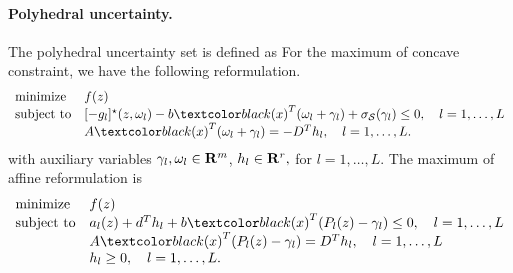 \paragraph{Polyhedral uncertainty.}
The polyhedral uncertainty set is defined as
For the maximum of concave constraint, we have the following reformulation.
\begin{equation*}
\begin{array}{ll}
	{\text{minimize}} & f(z)\\
	\mbox{subject to} & [-g_l]^\star(z,\omega_l) - b\RC{(x)}^T(\omega_l + \gamma_l) + \sigma_\supp(\gamma_l) \leq 0, \quad l = 1,\dots,L\\
	 &A\RC{(x)}^T(\omega_l+ \gamma_l) = -D^Th_l,\quad l = 1,\dots,L.
\end{array}
\end{equation*}
with auxiliary variables $\gamma_l, \omega_l \in {\mathbf R}^m$, $h_l \in {\mathbf R}^{r}, $ for $l = 1,\dots,L$. The maximum of affine reformulation is
\begin{equation*}
	\label{eq:poly_max}
	\begin{array}{ll}
		\mbox{minimize} & f(z)\\
		\mbox{subject to} &  a_l(z) + d^Th_l + b\RC{(x)}^T( P_l(z)-\gamma_l)\le 0, \quad l = 1,\dots,L\\
		& A\RC{(x)}^T(P_l(z)-\gamma_l) = D^Th_l , \quad l = 1,\dots,L\\
		& h_l \geq 0, \quad l = 1,\dots,L.
	\end{array}
\end{equation*}


